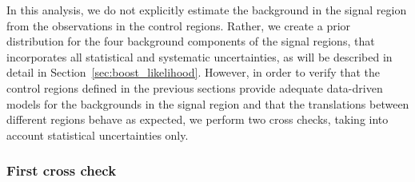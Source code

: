 
In this analysis, we do not explicitly estimate the background in the signal region from the
observations in the control regions. Rather, we create a prior distribution for the four background
components of the signal regions, that incorporates all statistical and systematic uncertainties, as
will be described in detail in Section~\ref{sec:boost_likelihood}. 
However, in order to verify that the control regions defined in the previous sections provide
adequate data-driven models for the backgrounds in the signal region and that the translations
between different regions behave as expected, we perform two cross checks, taking into account
statistical uncertainties only. 

\subsubsection{First cross check}

